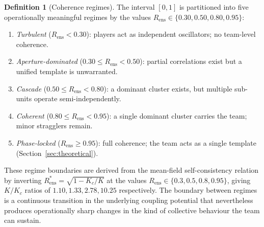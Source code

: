 \documentclass[11pt,twocolumn,a4paper]{article}
\theoremstyle{definition}
\newtheorem{definition}[theorem]{Definition}
\theoremstyle{remark}
\newcommand{\Rens}{R_{\mathrm{ens}}}
\newcommand{\Kc}{K_{c}}
\begin{document}
\begin{definition}[Coherence regimes]
\label{def:regimes}
The interval $[0,1]$ is partitioned into five operationally meaningful
regimes by the values $\Rens \in \{0.30, 0.50, 0.80, 0.95\}$:
\begin{enumerate}[leftmargin=1.4em]
  \item \emph{Turbulent} ($\Rens < 0.30$): players act as independent
    oscillators; no team-level coherence.
  \item \emph{Aperture-dominated} ($0.30 \leq \Rens < 0.50$): partial
    correlations exist but a unified template is unwarranted.
  \item \emph{Cascade} ($0.50 \leq \Rens < 0.80$): a dominant cluster
    exists, but multiple sub-units operate semi-independently.
  \item \emph{Coherent} ($0.80 \leq \Rens < 0.95$): a single dominant
    cluster carries the team; minor stragglers remain.
  \item \emph{Phase-locked} ($\Rens \geq 0.95$): full coherence; the
    team acts as a single template (Section~\ref{sec:theoretical}).
\end{enumerate}
\end{definition}

These regime boundaries are derived from the mean-field self-consistency
relation by inverting $\Rens^* = \sqrt{1-\Kc/K}$ at the values
$\Rens \in \{0.3, 0.5, 0.8, 0.95\}$, giving $K/\Kc$ ratios of
$1.10, 1.33, 2.78, 10.25$ respectively. The boundary between regimes is
a continuous transition in the underlying coupling potential
\citep{strogatz2000} that nevertheless produces operationally sharp
changes in the kind of collective behaviour the team can sustain.
\end{document}
